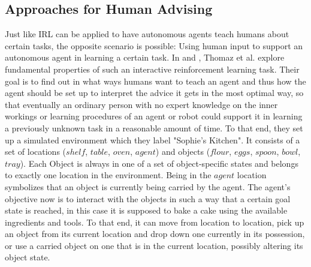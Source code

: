 \documentclass[12pt,twoside]{article}
\theoremstyle{plain}
\theoremstyle{definition}
\theoremstyle{remark}
\begin{document}
\subsection{Approaches for Human Advising}
Just like IRL can be applied to have autonomous agents teach humans about certain tasks, the opposite scenario is possible: Using human input to support an autonomous agent in learning a certain task. In \cite{thomaz2005real} and \cite{Thomaz2006reinforcement}, Thomaz et al. explore fundamental properties of such an interactive reinforcement learning task. Their goal is to find out in what ways humans want to teach an agent and thus how the agent should be set up to interpret the advice it gets in the most optimal way, so that eventually an ordinary person with no expert knowledge on the inner workings or learning procedures of an agent or robot could support it in learning a previously unknown task in a reasonable amount of time. To that end, they set up a simulated environment which they label "Sophie's Kitchen". It consists of a set of locations ($shelf$, $table$, $oven$, $agent$) and objects ($flour$, $eggs$, $spoon$, $bowl$, $tray$). Each Object is always in one of a set of object-specific states and belongs to exactly one location in the environment. Being in the $agent$ location symbolizes that an object is currently being carried by the agent. The agent's objective now is to interact with the objects in such a way that a certain goal state is reached, in this case it is supposed to bake a cake using the available ingredients and tools. To that end, it can move from location to location, pick up an object from its current location and drop down one currently in its possession, or use a carried object on one that is in the current location, possibly altering its object state. 
\\
\end{document}
